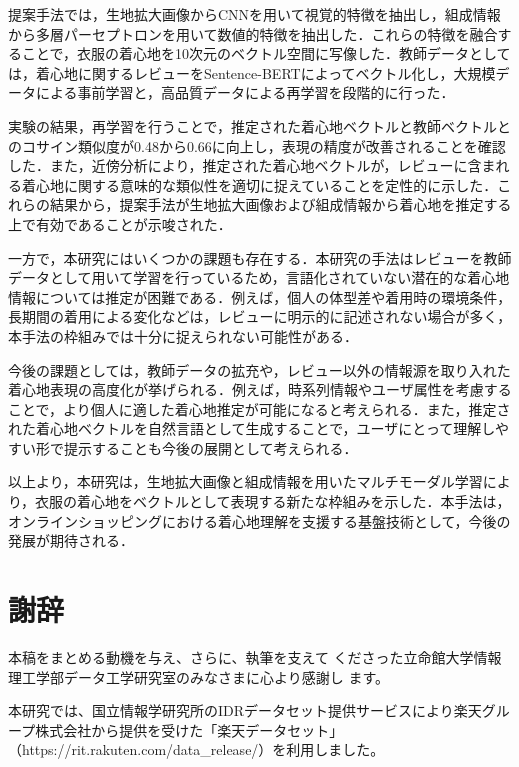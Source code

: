\documentclass[a4paper,12pt]{jreport}
\begin{document}
提案手法では，生地拡大画像からCNNを用いて視覚的特徴を抽出し，組成情報から多層パーセプトロンを用いて数値的特徴を抽出した．これらの特徴を融合することで，衣服の着心地を10次元のベクトル空間に写像した．教師データとしては，着心地に関するレビューをSentence-BERTによってベクトル化し，大規模データによる事前学習と，高品質データによる再学習を段階的に行った．

実験の結果，再学習を行うことで，推定された着心地ベクトルと教師ベクトルとのコサイン類似度が0.48から0.66に向上し，表現の精度が改善されることを確認した．また，近傍分析により，推定された着心地ベクトルが，レビューに含まれる着心地に関する意味的な類似性を適切に捉えていることを定性的に示した．これらの結果から，提案手法が生地拡大画像および組成情報から着心地を推定する上で有効であることが示唆された．

一方で，本研究にはいくつかの課題も存在する．本研究の手法はレビューを教師データとして用いて学習を行っているため，言語化されていない潜在的な着心地情報については推定が困難である．例えば，個人の体型差や着用時の環境条件，長期間の着用による変化などは，レビューに明示的に記述されない場合が多く，本手法の枠組みでは十分に捉えられない可能性がある．

今後の課題としては，教師データの拡充や，レビュー以外の情報源を取り入れた着心地表現の高度化が挙げられる．例えば，時系列情報やユーザ属性を考慮することで，より個人に適した着心地推定が可能になると考えられる．また，推定された着心地ベクトルを自然言語として生成することで，ユーザにとって理解しやすい形で提示することも今後の展開として考えられる．

以上より，本研究は，生地拡大画像と組成情報を用いたマルチモーダル学習により，衣服の着心地をベクトルとして表現する新たな枠組みを示した．本手法は，オンラインショッピングにおける着心地理解を支援する基盤技術として，今後の発展が期待される．




\chapter*{謝辞}

本稿をまとめる動機を与え、さらに、執筆を支えて
くださった立命館大学情報理工学部データ工学研究室のみなさまに心より感謝し
ます。

本研究では、国立情報学研究所のIDRデータセット提供サービスにより楽天グループ株式会社から提供を受けた「楽天データセット」（https://rit.rakuten.com/data\_release/）を利用しました。
\end{document}
